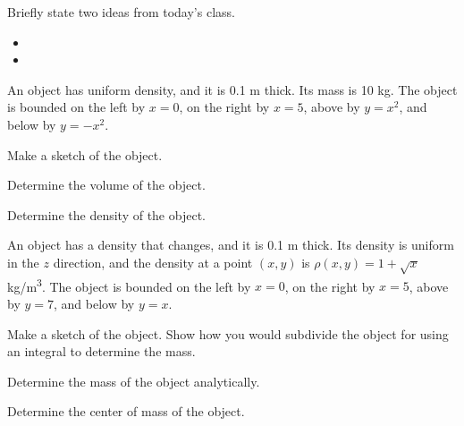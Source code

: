 \begin{problem}
\item Briefly state two ideas from today's class.
  \begin{itemize}
  \item
  \item
  \end{itemize}
\item An object has uniform density, and it is 0.1 m thick. Its mass
  is 10 kg. The object is bounded on the left by $x=0$, on the right
  by $x=5$, above by $y=x^2$, and below by $y=-x^2$.
  \begin{subproblem}
    \item Make a sketch of the object.
      \vfill
    \item Determine the volume of the object.
      \vfill
    \item Determine the density of the object.
      \vfill
  \end{subproblem}
  \clearpage

\item An object has a density that changes, and it is 0.1 m thick. Its
  density is uniform in the $z$ direction, and the density at a point
  $(x,y)$ is $\rho(x,y)=1+\sqrt{x}$ kg/m\textsuperscript{3}. The
  object is bounded on the left by $x=0$, on the right by $x=5$, above
  by $y=7$, and below by $y=x$.
  \begin{subproblem}
    \item Make a sketch of the object. Show how you would subdivide
      the object for using an integral to determine the mass.
      \vfill
    \item Determine the mass of the object analytically.
      \vfill
    \item Determine the center of mass of the object.
      \vfill
  \end{subproblem}
\end{problem}


